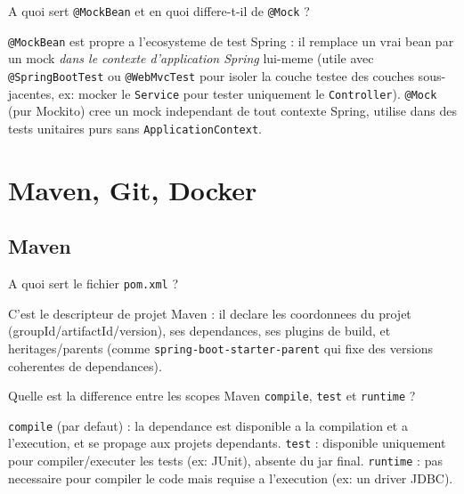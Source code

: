 \documentclass[11pt,a4paper]{article}
\begin{document}
\begin{question} A quoi sert \texttt{@MockBean} et en quoi differe-t-il de \texttt{@Mock} ?
\end{question}
\begin{reponse}
\texttt{@MockBean} est propre a l'ecosysteme de test Spring : il remplace un vrai bean par un mock \emph{dans le contexte d'application Spring} lui-meme (utile avec \texttt{@SpringBootTest} ou \texttt{@WebMvcTest} pour isoler la couche testee des couches sous-jacentes, ex: mocker le \texttt{Service} pour tester uniquement le \texttt{Controller}). \texttt{@Mock} (pur Mockito) cree un mock independant de tout contexte Spring, utilise dans des tests unitaires purs sans \texttt{ApplicationContext}.
\end{reponse}

\newpage
\section{Maven, Git, Docker}

\subsection{Maven}

\begin{question} A quoi sert le fichier \texttt{pom.xml} ?
\end{question}
\begin{reponse}
C'est le descripteur de projet Maven : il declare les coordonnees du projet (groupId/artifactId/version), ses dependances, ses plugins de build, et heritages/parents (comme \texttt{spring-boot-starter-parent} qui fixe des versions coherentes de dependances).
\end{reponse}

\begin{question} Quelle est la difference entre les scopes Maven \texttt{compile}, \texttt{test} et \texttt{runtime} ?
\end{question}
\begin{reponse}
\texttt{compile} (par defaut) : la dependance est disponible a la compilation et a l'execution, et se propage aux projets dependants. \texttt{test} : disponible uniquement pour compiler/executer les tests (ex: JUnit), absente du jar final. \texttt{runtime} : pas necessaire pour compiler le code mais requise a l'execution (ex: un driver JDBC).
\end{reponse}
\end{document}
